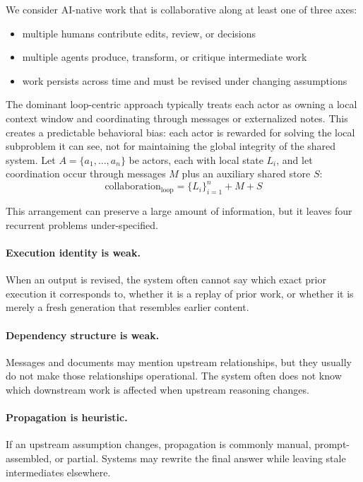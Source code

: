 \documentclass{article}
\begin{document}
We consider AI-native work that is collaborative along at least one of three axes:
\begin{itemize}
\item multiple humans contribute edits, review, or decisions
\item multiple agents produce, transform, or critique intermediate work
\item work persists across time and must be revised under changing assumptions
\end{itemize}

The dominant loop-centric approach typically treats each actor as owning a local context window and coordinating through messages or externalized notes. This creates a predictable behavioral bias: each actor is rewarded for solving the local subproblem it can see, not for maintaining the global integrity of the shared system. Let $A = \{a_1, \dots, a_n\}$ be actors, each with local state $L_i$, and let coordination occur through messages $M$ plus an auxiliary shared store $S$:
\begin{equation}
\text{collaboration}_{\mathrm{loop}} = \{L_i\}_{i=1}^{n} + M + S
\end{equation}

This arrangement can preserve a large amount of information, but it leaves four recurrent problems under-specified.

\paragraph{Execution identity is weak.}
When an output is revised, the system often cannot say which exact prior execution it corresponds to, whether it is a replay of prior work, or whether it is merely a fresh generation that resembles earlier content.

\paragraph{Dependency structure is weak.}
Messages and documents may mention upstream relationships, but they usually do not make those relationships operational. The system often does not know which downstream work is affected when upstream reasoning changes.

\paragraph{Propagation is heuristic.}
If an upstream assumption changes, propagation is commonly manual, prompt-assembled, or partial. Systems may rewrite the final answer while leaving stale intermediates elsewhere.
\end{document}
